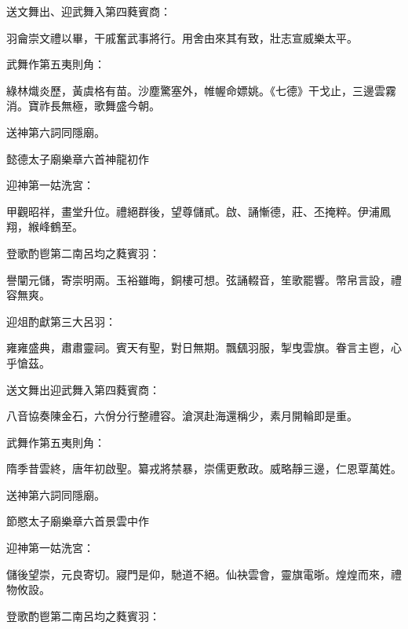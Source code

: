 \begin{pinyinscope}
 送文舞出、迎武舞入第四蕤賓商：



 羽龠崇文禮以畢，干戚奮武事將行。用舍由來其有致，壯志宣威樂太平。



 武舞作第五夷則角：



 綠林熾炎歷，黃虞格有苗。沙塵驚塞外，帷幄命嫖姚。《七德》干戈止，三邊雲霧消。寶祚長無極，歌舞盛今朝。



 送神第六詞同隱廟。



 懿德太子廟樂章六首神龍初作



 迎神第一姑洗宮：



 甲觀昭祥，畫堂升位。禮絕群後，望尊儲貳。啟、誦慚德，莊、丕掩粹。伊浦鳳翔，緱峰鶴至。



 登歌酌鬯第二南呂均之蕤賓羽：



 譽闡元儲，寄崇明兩。玉裕雖晦，銅樓可想。弦誦輟音，笙歌罷響。幣帛言設，禮容無爽。



 迎俎酌獻第三大呂羽：



 雍雍盛典，肅肅靈祠。賓天有聖，對日無期。飄颻羽服，掣曳雲旗。眷言主鬯，心乎愴茲。



 送文舞出迎武舞入第四蕤賓商：



 八音協奏陳金石，六佾分行整禮容。滄溟赴海還稱少，素月開輪即是重。



 武舞作第五夷則角：



 隋季昔雲終，唐年初啟聖。纂戎將禁暴，崇儒更敷政。威略靜三邊，仁恩覃萬姓。



 送神第六詞同隱廟。



 節愍太子廟樂章六首景雲中作



 迎神第一姑洗宮：



 儲後望崇，元良寄切。寢門是仰，馳道不絕。仙袂雲會，靈旗電晣。煌煌而來，禮物攸設。



 登歌酌鬯第二南呂均之蕤賓羽：




\end{pinyinscope}

